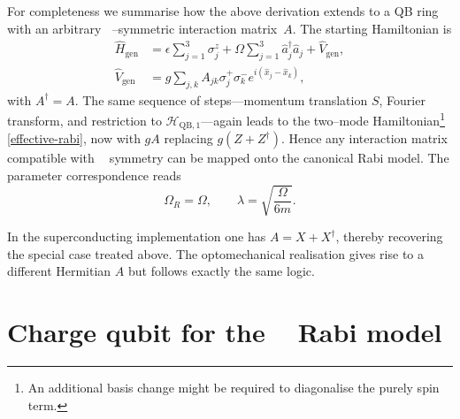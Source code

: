 \documentclass[reprint, aps, prx, amsmath, amssymb, longbibliography, superscriptaddress]{revtex4-2}
\DeclareMathOperator{\Zthree}{\mathbb{Z}_3}
\begin{document}
For completeness we summarise how the above derivation extends to a QB ring
with an arbitrary $\Zthree$--symmetric interaction matrix~$A$.  The starting
Hamiltonian is
\begin{equation}
\label{arbitary-interaction-hamiltonian}
  \begin{aligned}
    \hat H_{\text{gen}} &= \epsilon \sum_{j=1}^{3} \sigma_j^z
      + \Omega \sum_{j=1}^{3} \hat a_j^{\dagger} \hat a_j + \hat V_{\text{gen}},
      \\
    \hat V_{\text{gen}} &= g \sum_{j,k} A_{jk}
      \sigma_j^{+} \sigma_k^{-} e^{ i ( \hat x_j - \hat x_k ) },
  \end{aligned}
\end{equation}
with $A^{\dagger}=A$.  The same sequence of steps---momentum translation $S$,
Fourier transform, and restriction to $\mathcal H_{\text{QB},1}$---again leads
to the two--mode Hamiltonian\footnote{An additional basis change might be
required to diagonalise the purely spin term.}
\eqref{effective-rabi}, now with $gA$ replacing $g(Z+Z^{\dagger})$.  Hence any
interaction matrix compatible with $\Zthree$ symmetry can be mapped onto the
canonical Rabi model.  The parameter correspondence reads
\begin{equation}
  \Omega_R = \Omega, \qquad \lambda = \sqrt{ \frac{\Omega}{6 m} }.
\end{equation}

In the superconducting implementation one has $A = X + X^{\dagger}$, thereby
recovering the special case treated above.  The optomechanical realisation
gives rise to a different Hermitian $A$ but follows exactly the same logic.





\section{Charge qubit for the \texorpdfstring{$\Zthree$}{Z3} Rabi model}
\label{app:charge-qubit}
\end{document}
